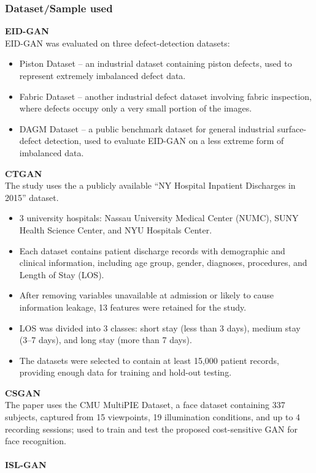 \documentclass[12pt,a4paper]{article}
\begin{document}
\subsubsection{Dataset/Sample used}
\textbf{EID-GAN} \\
EID-GAN was evaluated on three defect-detection datasets:
\begin{itemize}
    \item Piston Dataset – an industrial dataset containing piston defects, used to represent extremely imbalanced defect data.
    \item Fabric Dataset – another industrial defect dataset involving fabric inspection, where defects occupy only a very small portion of the images.
    \item DAGM Dataset – a public benchmark dataset for general industrial surface-defect detection, used to evaluate EID-GAN on a less extreme form of imbalanced data.
\end{itemize}
\textbf{CTGAN} \\
The study uses the a publicly available “NY Hospital Inpatient Discharges in 2015” dataset.
\begin{itemize}
    \item 3 university hospitals: Nassau University Medical Center (NUMC), SUNY Health Science Center, and NYU Hospitals Center.
    \item Each dataset contains patient discharge records with demographic and clinical information, including age group, gender, diagnoses, procedures, and Length of Stay (LOS).
    \item After removing variables unavailable at admission or likely to cause information leakage, 13 features were retained for the study.
    \item LOS was divided into 3 classes: short stay (less than 3 days), medium stay (3–7 days), and long stay (more than 7 days).
    \item The datasets were selected to contain at least 15,000 patient records, providing enough data for training and hold-out testing.
\end{itemize}
\textbf{CSGAN} \\
The paper uses the CMU MultiPIE Dataset, a face dataset containing 337 subjects, captured from 15 viewpoints, 19 illumination conditions, and up to 4 recording sessions; used to train and test the proposed cost-sensitive GAN for face recognition. \\
\\ \textbf{ISL-GAN} \\
\end{document}
